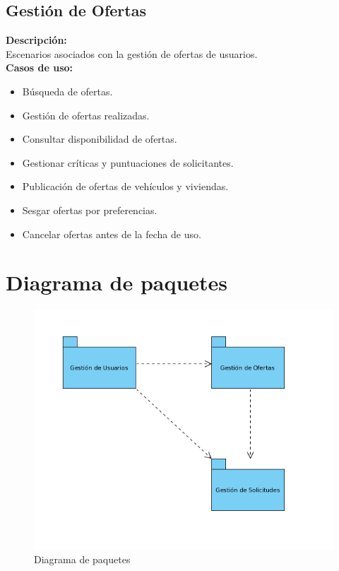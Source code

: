 \subsection{Gestión de Ofertas}
\textbf{Descripción:}\\
Escenarios asociados con la gestión de ofertas de usuarios.\\
\textbf{Casos de uso:}\\
	\begin{itemize}
		\item Búsqueda de ofertas.
		\item Gestión de ofertas realizadas.
		\item	Consultar disponibilidad de ofertas.
		\item Gestionar críticas y puntuaciones de solicitantes.
		\item Publicación de ofertas de vehículos y viviendas.
		\item Sesgar ofertas por preferencias.
		\item Cancelar ofertas antes de la fecha de uso.											
	\end{itemize}

\section{Diagrama de paquetes}
	\begin{figure}[H] 
		\centering
		\includegraphics[scale=0.6]{Diagrama_de_paquetes.png}  
		\caption{Diagrama de paquetes} \label{fig:figura1}
	\end{figure}
\newpage
